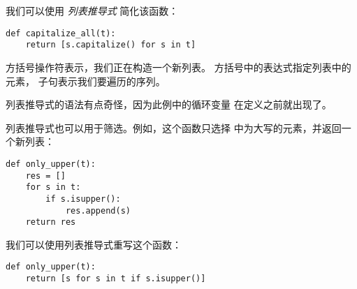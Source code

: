
我们可以使用 {\em 列表推导式} 简化该函数：


\begin{lstlisting}
def capitalize_all(t):
    return [s.capitalize() for s in t]
\end{lstlisting}


方括号操作符表示，我们正在构造一个新列表。
方括号中的表达式指定列表中的元素，  子句表示我们要遍历的序列。

  


列表推导式的语法有点奇怪，因为此例中的循环变量  在定义之前就出现了。


列表推导式也可以用于筛选。例如，这个函数只选择  中为大写的元素，并返回一个新列表：

  

\begin{lstlisting}
def only_upper(t):
    res = []
    for s in t:
        if s.isupper():
            res.append(s)
    return res
\end{lstlisting}


我们可以使用列表推导式重写这个函数：

\begin{lstlisting}
def only_upper(t):
    return [s for s in t if s.isupper()]
\end{lstlisting}


